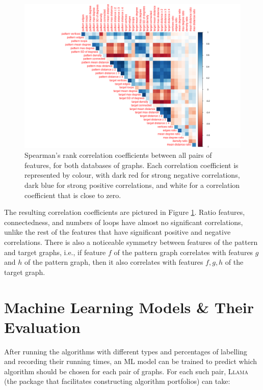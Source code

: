 \documentclass{l4proj}
\theoremstyle{definition}
\theoremstyle{remark}
\begin{document}
\begin{figure}
  \centering
  \includegraphics[width=\textwidth]{images/feature_correlations.png}
  \caption{Spearman's rank correlation coefficients between all pairs of
    features, for both databases of graphs. Each correlation coefficient is
    represented by colour, with dark red for strong negative correlations,
    dark blue for strong positive correlations, and white for a correlation
    coefficient that is close to zero.}
  \label{fig:feature_correlations}
\end{figure}

The resulting correlation coefficients are pictured in Figure
\ref{fig:feature_correlations}. Ratio features, connectedness, and numbers of
loops have almost no significant correlations, unlike the rest of the features
that have significant positive and negative correlations. There is also a
noticeable symmetry between features of the pattern and target graphs, i.e., if
feature $f$ of the pattern graph correlates with features $g$ and $h$ of the
pattern graph, then it also correlates with features $f, g, h$ of the target
graph.

\chapter{Machine Learning Models \& Their Evaluation} \label{chapter:ml}

After running the algorithms  with different types and percentages of labelling
and recording their running times, an ML model can be trained to predict which
algorithm should be chosen for each pair of graphs. For each such pair,
\textsc{Llama} \cite{llama} (the package that facilitates constructing algorithm
portfolios) can take:
\end{document}
